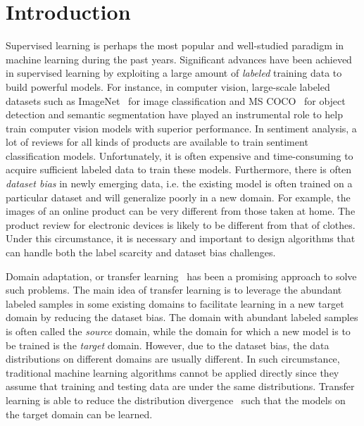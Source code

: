 \documentclass[acmsmall]{acmart}
\begin{document}

     




\maketitle

\section{Introduction}
Supervised learning is perhaps the most popular and well-studied paradigm in machine learning during the past years. Significant advances have been achieved in supervised learning by exploiting a large amount of \textit{labeled} training data to build powerful models. For instance, in computer vision, large-scale labeled datasets such as ImageNet~\cite{deng2009imagenet} for image classification and MS COCO~\cite{lin2014microsoft} for object detection and semantic segmentation have played an instrumental role to help train computer vision models with superior performance. In sentiment analysis, a lot of reviews for all kinds of products are available to train sentiment classification models. Unfortunately, it is often expensive and time-consuming to acquire sufficient labeled data to train these models. Furthermore, there is often \textit{dataset bias} in newly emerging data, i.e. the existing model is often trained on a particular dataset and will generalize poorly in a new domain. For example, the images of an online product can be very different from those taken at home. The product review for electronic devices is likely to be different from that of clothes. Under this circumstance, it is necessary and important to design algorithms that can handle both the label scarcity and dataset bias challenges.

Domain adaptation, or transfer learning~\cite{pan2010survey,transferlearning} has been a promising approach to solve such problems. The main idea of transfer learning is to leverage the abundant labeled samples in some existing domains to facilitate learning in a new target domain by reducing the dataset bias. The domain with abundant labeled samples is often called the \textit{source} domain, while the domain for which a new model is to be trained is the \textit{target} domain. However, due to the dataset bias, the data distributions on different domains are usually different. In such circumstance, traditional machine learning algorithms cannot be applied directly since they assume that training and testing data are under the same distributions. Transfer learning is able to reduce the distribution divergence~\cite{pan2010survey} such that the models on the target domain can be learned.
\end{document}
